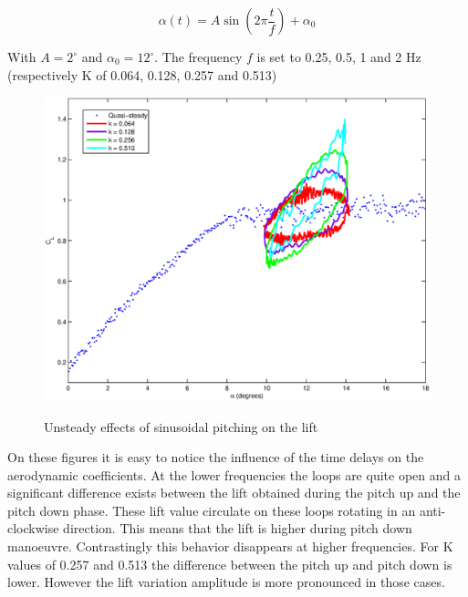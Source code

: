 \begin{equation}
  \alpha\left( t \right)= A \sin \left( 2 \pi \frac{t}{f} \right) + \alpha_0
  \label{eqn:pitch_input}
\end{equation}

With $A=2^\circ$ and $\alpha_0=12^\circ$.
The frequency $f$ is set to 0.25, 0.5, 1 and 2 Hz (respectively K of 0.064, 0.128, 0.257 and 0.513)

\begin{figure}[h]
  \begin{center}
    \scalebox{0.6}  
    {\includegraphics{./Figures/Pitching_allcases_CL_12_amp_2.eps}}
  \end{center}
  \caption{Unsteady effects of sinusoidal pitching on the lift}
  \label{fig:Pitching_allcases_Cl_12}
\end{figure}
%
%
\par On these figures it is easy to notice the influence of the time delays on the aerodynamic coefficients.
At the lower frequencies the loops are quite open and a significant difference exists between the lift obtained during the pitch up and the pitch down phase.
These lift value circulate on these loops rotating in an anti-clockwise direction.
This means that the lift is higher during pitch down manoeuvre.
Contrastingly this behavior disappears at higher frequencies.
For K values of 0.257 and 0.513 the difference between the pitch up and pitch down is lower.
However the lift variation amplitude is more pronounced in those cases.


